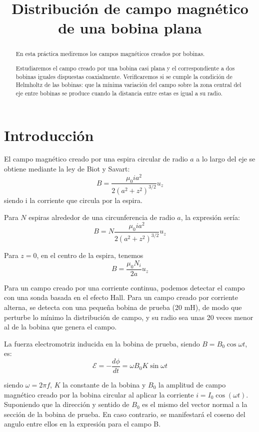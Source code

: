 \documentclass[a4paper,12pt,spanish]{article}
\begin{document}
	
	
	\title{Distribución de campo magnético de una bobina plana}
	
	\date{}
	
	\maketitle
	
	
	
	\begin{abstract} %
		
		En esta práctica mediremos los campos magnéticos creados por bobinas. 
		
		Estudiaremos el campo creado por una bobina casi plana y el correspondiente a dos bobinas iguales dispuestas coaxialmente. Verificaremos si se cumple la condición de Helmholtz de las bobinas: que la mínima variación del campo sobre la zona central del eje entre bobinas se produce cuando la distancia entre estas es igual a su radio.
		
	\end{abstract}

\section{Introducción}

El campo magnético creado por una espira circular de radio $a$ a lo largo del eje se obtiene mediante la ley de Biot y Savart:
\[B = \frac{\mu_0 i a^2}{2(a^2 + z^2)^{3/2}} u_z\]
siendo i la corriente que circula por la espira. 

Para $N$ espiras alrededor de una circunferencia de radio $a$, la expresión sería:
\[B = N\frac{\mu_0 i a^2}{2(a^2 + z^2)^{3/2}} u_z\]

Para $z= 0$, en el centro de la espira, tenemos
\[B = \frac{\mu_0 N_i}{2a}u_z\]

Para un campo creado por una corriente continua, podemos detectar el campo con una sonda basada en el efecto Hall. Para un campo creado por corriente alterna, se detecta con una pequeña bobina de prueba (20 mH), de modo que perturbe lo mínimo la distribución de campo, y su radio sea unas 20 veces menor al de la bobina que genera el campo.

La fuerza electromotriz inducida en la bobina de prueba, siendo $B = B_0 \cos \omega t$, es: 
\[ \mathcal{E} = -\frac{d \phi}{dt} = \omega B_0 K \sin \omega t\]

siendo $\omega = 2\pi f$, $K$ la constante de la bobina y $B_0$ la amplitud de campo magnético creado por la bobina circular al aplicar la corriente $i = I_0 \cos(\omega t)$.
Suponiendo que la dirección y sentido de $B_0$ es el mismo del vector normal a la sección de la bobina de prueba.
En caso contrario, se manifestará el coseno del angulo entre ellos en la expresión para el campo B.
\end{document}
